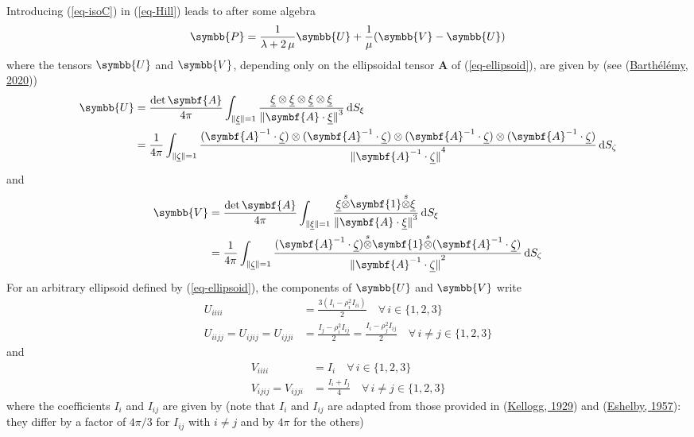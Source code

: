 \documentclass[
  letterpaper,
  DIV=11,
  numbers=noendperiod]{scrreprt}
\newcommand{\uu}[1]{{\symbf{{#1}}}}
\newcommand{\uuuu}[1]{{\symbb{{#1}}}}
\newcommand{\uv}[1]{{\underline{{#1}}}}
\newcommand{\sotimes}{{\stackrel{s}{\otimes}}}
\newcommand{\norm}[1]{{\lVert{{#1}}\rVert}}
\newcommand{\ud}{{\,\mathrm{d}}}
\begin{document}
Introducing (\ref{eq-isoC}) in (\ref{eq-Hill}) leads to after some
algebra \[
\uuuu{P}=
\frac{1}{\lambda+2\,\mu}
\uuuu{U}
+\frac{1}{\mu}(\uuuu{V}-\uuuu{U})
\] where the tensors \(\uuuu{U}\) and \(\uuuu{V}\), depending only on
the ellipsoidal tensor \(\uu{A}\) of (\ref{eq-ellipsoid}), are given by
(see (\protect\hyperlink{ref-barthelemyIJES2020_hilltrans}{Barthélémy,
2020})) \[\begin{aligned}
\uuuu{U} &= \frac{\det{\uu{A}}}{4\pi}
\int_{\norm{\uv{\xi}}=1}
\frac{\uv{\xi}\otimes\uv{\xi}\otimes\uv{\xi}\otimes\uv{\xi}}
{\norm{\uu{A}\cdot\uv{\xi}}^3}\ud S_{\xi}\\
&=
\frac{1}{4\pi}
\int_{\norm{\uv{\zeta}}=1}
\frac{%
(\uu{A}^{-1}\cdot\uv{\zeta})
\otimes
(\uu{A}^{-1}\cdot\uv{\zeta})
\otimes
(\uu{A}^{-1}\cdot\uv{\zeta})
\otimes
(\uu{A}^{-1}\cdot\uv{\zeta})
}{\norm{\uu{A}^{-1}\cdot\uv{\zeta}}^4}
\ud S_{\zeta}
\end{aligned}\] and \[\begin{aligned}
\uuuu{V} &= \frac{\det{\uu{A}}}{4\pi}
\int_{\norm{\uv{\xi}}=1}
\frac{\uv{\xi}\sotimes\uu{1}\sotimes\uv{\xi}}
{\norm{\uu{A}\cdot\uv{\xi}}^3}\ud S_{\xi}\\
&=
\frac{1}{4\pi}
\int_{\norm{\uv{\zeta}}=1}
\frac{%
(\uu{A}^{-1}\cdot\uv{\zeta})
\sotimes
\uu{1}
\sotimes
(\uu{A}^{-1}\cdot\uv{\zeta})
}{\norm{\uu{A}^{-1}\cdot\uv{\zeta}}^2}
\ud S_{\zeta}
\end{aligned}\] For an arbitrary ellipsoid defined by
(\ref{eq-ellipsoid}), the components of \(\uuuu{U}\) and \(\uuuu{V}\)
write \[\begin{aligned}
U_{iiii}&=\frac{3(I_i-\rho_i^2I_{ii})}{2} 
\quad\forall\, i\in\{1,2,3\}\\
U_{iijj}=U_{ijij}=U_{ijji}&=\frac{I_j-\rho_i^2I_{ij}}{2} 
=\frac{I_i-\rho_j^2I_{ij}}{2}
\quad\forall\, i\neq j\in\{1,2,3\}
\end{aligned}\] and \[\begin{aligned}
V_{iiii}&=I_i\quad\forall\, i\in\{1,2,3\}\\
V_{ijij}=V_{ijji}&=\frac{I_i+I_j}{4}
\quad\forall\, i\neq j\in\{1,2,3\}
\end{aligned}\] where the coefficients \(I_i\) and \(I_{ij}\) are given
by (note that \(I_i\) and \(I_{ij}\) are adapted from those provided in
(\protect\hyperlink{ref-kellogg1929}{Kellogg, 1929}) and
(\protect\hyperlink{ref-eshelby1957}{Eshelby, 1957}): they differ by a
factor of \(4\pi/3\) for \(I_{ij}\) with \(i\neq j\) and by \(4\pi\) for
the others)
\end{document}

